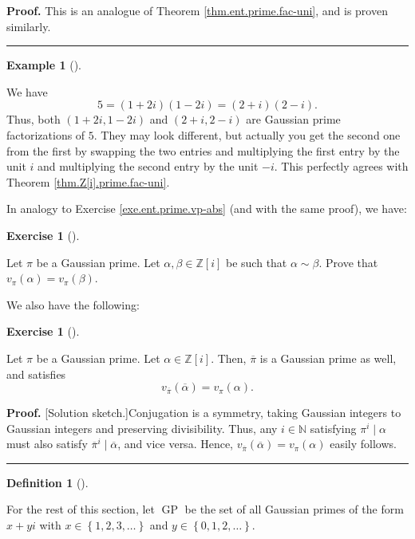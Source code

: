 \documentclass[numbers=enddot,12pt,final,onecolumn,notitlepage]{scrartcl}%
\newcounter{exer}
\numberwithin{exer}{subsection}
\theoremstyle{definition}
\newtheorem{defi}[theo]{Definition}
\newenvironment{definition}[1][]
{\begin{defi}[#1]\begin{leftbar}}
{\end{leftbar}\end{defi}}
\newtheorem{exam}[theo]{Example}
\newenvironment{example}[1][]
{\begin{exam}[#1]\begin{leftbar}}
{\end{leftbar}\end{exam}}
\newtheorem{exmp}[exer]{Exercise}
\newenvironment{exercise}[1][]
{\begin{exmp}[#1]\begin{leftbar}}
{\end{leftbar}\end{exmp}}
\newenvironment{proof}[1][Proof]{\noindent\textbf{#1.} }{\ \rule{0.5em}{0.5em}}
\begin{document}
\begin{proof}
This is an analogue of Theorem \ref{thm.ent.prime.fac-uni}, and is proven similarly.
\end{proof}

\begin{example}
We have
\[
5=\left(  1+2i\right)  \left(  1-2i\right)  =\left(  2+i\right)  \left(
2-i\right)  .
\]
Thus, both $\left(  1+2i,1-2i\right)  $ and $\left(  2+i,2-i\right)  $ are
Gaussian prime factorizations of $5$. They may look different, but actually
you get the second one from the first by swapping the two entries and
multiplying the first entry by the unit $i$ and multiplying the second entry
by the unit $-i$. This perfectly agrees with Theorem
\ref{thm.Z[i].prime.fac-uni}.
\end{example}

In analogy to Exercise \ref{exe.ent.prime.vp-abs} (and with the same proof),
we have:

\begin{exercise}
\label{exe.Z[i].prime.vp-abs}Let $\pi$ be a Gaussian prime. Let $\alpha
,\beta\in\mathbb{Z}\left[  i\right]  $ be such that $\alpha\sim\beta$. Prove
that $v_{\pi}\left(  \alpha\right)  =v_{\pi}\left(  \beta\right)  $.
\end{exercise}

We also have the following:

\begin{exercise}
\label{exe.Z[i].prime.vp-conj}Let $\pi$ be a Gaussian prime. Let $\alpha
\in\mathbb{Z}\left[  i\right]  $. Then, $\overline{\pi}$ is a Gaussian prime
as well, and satisfies%
\[
v_{\overline{\pi}}\left(  \overline{\alpha}\right)  =v_{\pi}\left(
\alpha\right)  .
\]

\end{exercise}

\begin{proof}
[Solution sketch.]Conjugation is a symmetry, taking Gaussian integers to
Gaussian integers and preserving divisibility. Thus, any $i\in\mathbb{N}$
satisfying $\pi^{i}\mid\alpha$ must also satisfy $\overline{\pi}^{i}%
\mid\overline{\alpha}$, and vice versa. Hence, $v_{\overline{\pi}}\left(
\overline{\alpha}\right)  =v_{\pi}\left(  \alpha\right)  $ easily follows.
\end{proof}

\begin{definition}
For the rest of this section, let $\operatorname*{GP}$ be the set of all
Gaussian primes of the form $x+yi$ with $x\in\left\{  1,2,3,\ldots\right\}  $
and $y\in\left\{  0,1,2,\ldots\right\}  $.
\end{definition}
\end{document}
